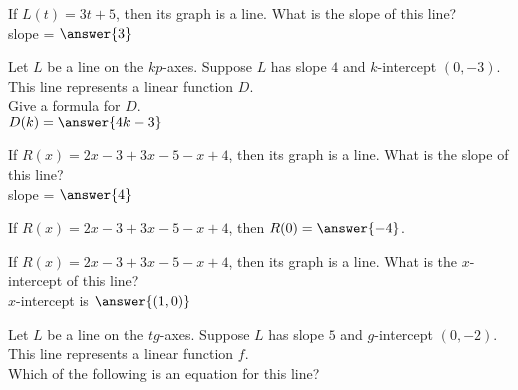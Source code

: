 \documentclass{ximera}
\begin{document}
\begin{exercise}

If $L(t) = 3t + 5$, then its graph is a line. What is the slope of this line? \\
slope = $\answer{3}$

\end{exercise}




\begin{exercise}

Let $L$ be a line on the $kp$-axes.  Suppose $L$ has slope $4$ and $k$-intercept $(0, -3)$.  \\
This line represents a linear function $D$.  \\
Give a formula for $D$. \\
$D(k) = \answer{4k - 3}$ 

\end{exercise}






\begin{exercise}

If $R(x) = 2x - 3 + 3x - 5 - x + 4$, then its graph is a line. What is the slope of this line? \\
slope = $\answer{4}$

\end{exercise}




\begin{exercise}

If $R(x) = 2x - 3 + 3x - 5 - x + 4$, then $R(0) = \answer{-4}$. \\


\end{exercise}





\begin{exercise}

If $R(x) = 2x - 3 + 3x - 5 - x + 4$, then its graph is a line. What is the $x$-intercept of this line? \\
$x$-intercept is $\answer{(1,0)}$

\end{exercise}






\begin{exercise}

Let $L$ be a line on the $tg$-axes.  Suppose $L$ has slope $5$ and $g$-intercept $(0, -2)$.  \\
This line represents a linear function $f$.  \\
Which of the following is an equation for this line?

\begin{multipleChoice}
\end{multipleChoice}

\end{exercise}
\end{document}
